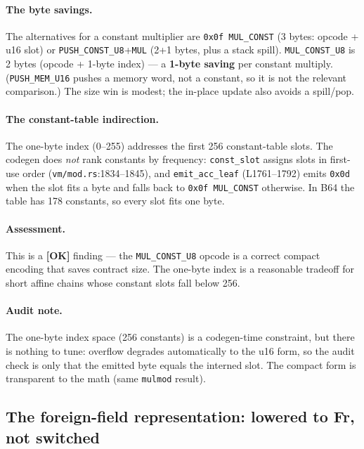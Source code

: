 \paragraph{The byte savings.}  The
alternatives for a constant multiplier are \texttt{0x0f
MUL\_CONST} (3 bytes: opcode + u16 slot) or
\texttt{PUSH\_CONST\_U8}+\texttt{MUL} (2+1 bytes, plus a stack
spill). \texttt{MUL\_CONST\_U8} is 2 bytes (opcode + 1-byte
index) --- a \textbf{1-byte saving} per constant multiply.
(\texttt{PUSH\_MEM\_U16} pushes a memory word, not a constant, so
it is not the relevant comparison.) The size win is modest; the
in-place update also avoids a spill/pop.

\paragraph{The constant-table indirection.} The one-byte index
(0--255) addresses the first 256 constant-table slots.
 The codegen does \emph{not} rank constants by
frequency: \texttt{const\_slot} assigns slots in first-use order
(\texttt{vm/mod.rs}:1834--1845), and \texttt{emit\_acc\_leaf}
(L1761--1792) emits \texttt{0x0d} when the slot fits a byte and
falls back to \texttt{0x0f MUL\_CONST} otherwise. In B64 the
table has 178 constants, so every slot fits one byte.

\paragraph{Assessment.} This is a
\textcolor{tracegreen}{\textbf{[OK]}} finding --- the
\texttt{MUL\_CONST\_U8} opcode is a correct compact encoding
that saves contract size. The one-byte index is a reasonable
tradeoff for short affine chains whose constant slots fall below
256.

\paragraph{Audit note.} The one-byte index space (256 constants)
is a codegen-time constraint, but there is nothing to tune:
overflow degrades automatically to the u16 form, so the audit
check is only that the emitted byte equals the interned slot. The
compact form is transparent to the math (same \texttt{mulmod}
result).

\subsection{The foreign-field representation: lowered to Fr, not switched}
\label{sec:pr-foreignfield}

